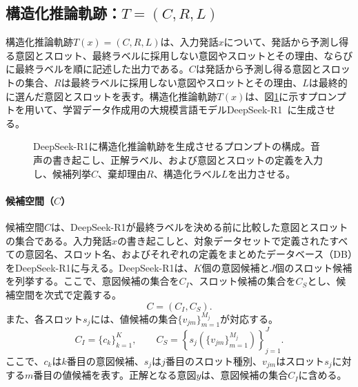 \documentclass[11pt,a4paper]{ltjsarticle}
\begin{document}
\subsection{構造化推論軌跡：$T=(C,R,L)$}
構造化推論軌跡$T(x)=(C,R,L)$は、入力発話$x$について、発話から予測し得る意図とスロット、最終ラベルに採用しない意図やスロットとその理由、ならびに最終ラベルを順に記述した出力である。$C$は発話から予測し得る意図とスロットの集合、$R$は最終ラベルに採用しない意図やスロットとその理由、$L$は最終的に選んだ意図とスロットを表す。構造化推論軌跡$T(x)$は、図\ref{fig:prompt}に示すプロンプトを用いて、学習データ作成用の大規模言語モデルDeepSeek-R1~\cite{Guo_2025}に生成させる。

\begin{figure}[htbp]
\centering
{}
\caption{DeepSeek-R1に構造化推論軌跡を生成させるプロンプトの構成。音声の書き起こし、正解ラベル、および意図とスロットの定義を入力し、候補列挙$C$、棄却理由$R$、構造化ラベル$L$を出力させる。}
\label{fig:prompt}
\end{figure}

\paragraph{候補空間（$C$）}
候補空間$C$は、DeepSeek-R1が最終ラベルを決める前に比較した意図とスロットの集合である。入力発話$x$の書き起こしと、対象データセットで定義されたすべての意図名、スロット名、およびそれぞれの定義をまとめたデータベース（DB）をDeepSeek-R1に与える。DeepSeek-R1は、$K$個の意図候補と$J$個のスロット候補を列挙する。ここで、意図候補の集合を$C_I$、スロット候補の集合を$C_S$とし、候補空間を次式で定義する。
\begin{equation}
C=(C_I,C_S).
\tag{1}
\end{equation}
また、各スロット$s_j$には、値候補の集合$\{v_{jm}\}_{m=1}^{M_j}$が対応する。
\begin{equation}
C_I=\{c_k\}_{k=1}^{K}, \qquad
C_S=\left\{s_j\left(\{v_{jm}\}_{m=1}^{M_j}\right)\right\}_{j=1}^{J}.
\tag{2}
\end{equation}
ここで、$c_k$は$k$番目の意図候補、$s_j$は$j$番目のスロット種別、$v_{jm}$はスロット$s_j$に対する$m$番目の値候補を表す。正解となる意図$y$は、意図候補の集合$C_I$に含める。
\end{document}
